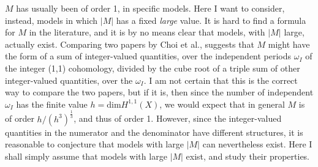\documentclass[a4paper,12pt,oneside]{article}
\begin{document}
$M$ has usually been of order 1, in specific models.  Here I want to
consider, instead, models in which $\vert M\vert$ has a
fixed \emph{large} value.  It is hard to find a formula for $M$ in 
the literature, and it is by no means clear that models, with 
$\vert M\vert$ large, actually exist.  Comparing two papers 
\cite{Choi1, Choi2} by Choi et al., suggests that $M$ might have the form 
of a sum of integer-valued quantities, over the independent periods 
$\omega_I$ of the integer (1,1) cohomology, divided by the cube root
of a triple sum of other integer-valued quantities, over the 
$\omega_I$.  I am not certain that this is the correct way to 
compare the two papers, but if it is, then since the number of
independent $\omega_I$ has the finite value $h = 
\mathrm{dim}H^{1,1}(X)$, we would expect that in general $M$ is of 
order 
$h/(h^3)^{\frac{1}{3}}$, and thus of order 1.  However, since the
integer-valued quantities in the numerator and the denominator have
different structures, it is reasonable to conjecture that models 
with large $\vert M\vert$ can nevertheless exist.  Here I shall 
simply assume that models with large $\vert M\vert$ exist, and
study their properties.
\end{document}
